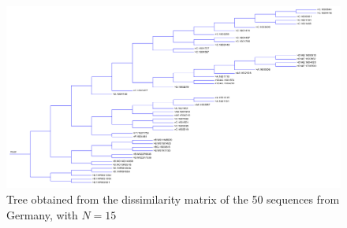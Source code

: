 \documentclass[english,13pt,a4paper]{article}
\theoremstyle{definition}
\theoremstyle{remark}
\theoremstyle{defstyle}
\begin{document}
\begin{figure}[H]
    \centering
    \includegraphics[width=.95\textheight, angle=90]{../Trees/50_tree.png}
    \caption{Tree obtained from the dissimilarity matrix of the 50 sequences from Germany, with $N = 15$}
    \label{fig:tree50}
\end{figure}
\end{document}
